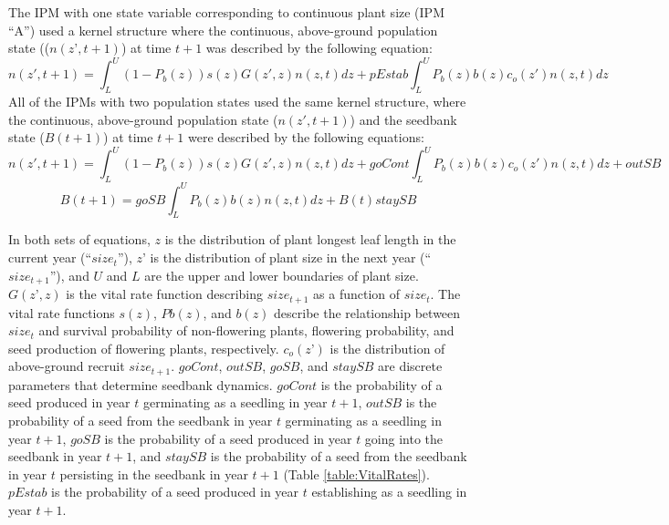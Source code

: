 \documentclass[12pt, letterpaper]{article}
\begin{document}
\normalsize{}
The IPM with one state variable corresponding to continuous plant size (IPM “A”) used a kernel structure where the continuous, above-ground population state (($n(z’, t+1)$) at time $t+1$ was described by the following equation:  
\begin{equation}\label{eqn:oneStateIPM}
n(z', t+1) = \int_{L}^{U}(1-P_b(z))s(z)G(z',z)n(z,t)dz + pEstab\int_{L}^{U}P_b(z)b(z)c_o(z')n(z,t)dz
\end{equation}
All of the IPMs with two population states used the same kernel structure, where the continuous, above-ground population state ($n(z',t+1)$) and the seedbank state ($B(t+1)$) at time $t+1$ were described by the following equations: 
\begin{equation}\label{eqn:twoStateIPM_cont}
n(z', t+1) = \int_{L}^{U}(1-P_b(z))s(z)G(z',z)n(z,t)dz + goCont\int_{L}^{U}P_b(z)b(z)c_o(z')n(z,t)dz + outSB 
\end{equation}
\begin{equation}\label{eqn:twoStateIPM_disc}
     B(t+1) = goSB\int_{L}^{U}P_b(z)b(z)n(z,t)dz + B(t)staySB 
\end{equation}

In both sets of equations, $z$ is the distribution of plant longest leaf length in the current year (“$size_t$”), $z’$ is the distribution of plant size in the next year (“$size_{t+1}$”), and $U$ and $L$ are the upper and lower boundaries of plant size. $G(z’, z)$ is the vital rate function describing $size_{t+1}$ as a function of $size_t$. The vital rate functions $s(z)$, $Pb(z)$, and $b(z)$ describe the relationship between $size_t$ and survival probability of non-flowering plants, flowering probability, and seed production of flowering plants, respectively.  $c_o(z’)$ is the distribution of above-ground recruit $size_{t+1}$. $goCont$, $outSB$, $goSB$, and $staySB$ are discrete parameters that determine seedbank dynamics. $goCont$ is the probability of a seed produced in year $t$ germinating as a seedling in year $t+1$, $outSB$ is the probability of a seed from the seedbank in year $t$ germinating as a seedling in year $t+1$, $goSB$ is the probability of a seed produced in year $t$ going into the seedbank in year $t+1$, and $staySB$ is the probability of a seed from the seedbank in year $t$ persisting in the seedbank in year $t+1$ \cite{Paniw2017} (Table \ref{table:VitalRates}). $pEstab$ is the probability of a seed produced in year $t$ establishing as a seedling in year $t+1$.  
\end{document}
